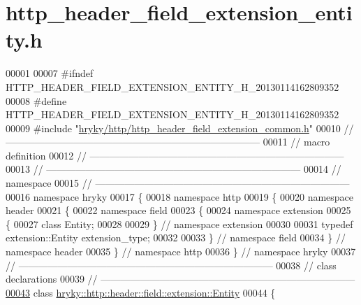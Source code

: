 \hypertarget{http__header__field__extension__entity_8h_source}{\section{http\-\_\-header\-\_\-field\-\_\-extension\-\_\-entity.\-h}
}

\begin{DoxyCode}
00001 
00007 \textcolor{preprocessor}{#ifndef HTTP\_HEADER\_FIELD\_EXTENSION\_ENTITY\_H\_20130114162809352}
00008 \textcolor{preprocessor}{}\textcolor{preprocessor}{#define HTTP\_HEADER\_FIELD\_EXTENSION\_ENTITY\_H\_20130114162809352}
00009 \textcolor{preprocessor}{}\textcolor{preprocessor}{#include "\hyperlink{http__header__field__extension__common_8h}{hryky/http/http_header_field_extension_common.h}"}
00010 \textcolor{comment}{//
      ------------------------------------------------------------------------------}
00011 \textcolor{comment}{// macro definition}
00012 \textcolor{comment}{//
      ------------------------------------------------------------------------------}
00013 \textcolor{comment}{//
      ------------------------------------------------------------------------------}
00014 \textcolor{comment}{// namespace}
00015 \textcolor{comment}{//
      ------------------------------------------------------------------------------}
00016 \textcolor{keyword}{namespace }hryky
00017 \{
00018 \textcolor{keyword}{namespace }http
00019 \{
00020 \textcolor{keyword}{namespace }header
00021 \{
00022 \textcolor{keyword}{namespace }field
00023 \{
00024 \textcolor{keyword}{namespace }extension
00025 \{
00027     \textcolor{keyword}{class }Entity;
00028 
00029 \} \textcolor{comment}{// namespace extension}
00030 
00031 \textcolor{keyword}{typedef} extension::Entity extension\_type;
00032 
00033 \} \textcolor{comment}{// namespace field}
00034 \} \textcolor{comment}{// namespace header}
00035 \} \textcolor{comment}{// namespace http}
00036 \} \textcolor{comment}{// namespace hryky}
00037 \textcolor{comment}{//
      ------------------------------------------------------------------------------}
00038 \textcolor{comment}{// class declarations}
00039 \textcolor{comment}{//
      ------------------------------------------------------------------------------}
\hypertarget{http__header__field__extension__entity_8h_source_l00043}{}\hyperlink{classhryky_1_1http_1_1header_1_1field_1_1extension_1_1_entity}{00043} \textcolor{comment}{}\textcolor{keyword}{class }\hyperlink{classhryky_1_1http_1_1header_1_1field_1_1extension_1_1_entity}{hryky::http::header::field::extension::Entity}
00044 \{

\end{DoxyCode}
